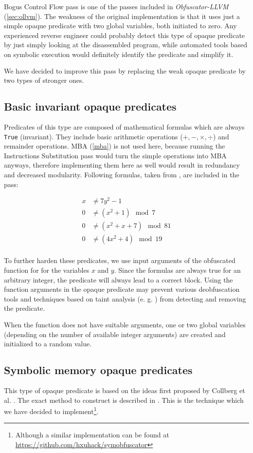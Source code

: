 \documentclass[
  digital, %
  table,   %
  twoside, %
  nolof,     %
  nolot,     %
]{fithesis3}
\theoremstyle{definition}
\begin{document}
Bogus Control Flow pass is one of the passes included in \textit{Obfuscator-LLVM} (\ref{sec:ollvm}). The weakness of the original implementation is that it uses just a simple opaque predicate with two global variables, both initiated to zero. Any experienced reverse engineer could probably detect this type of opaque predicate by just simply looking at the disassembled program, while automated tools based on symbolic execution would definitely identify the predicate and simplify it. 

We have decided to improve this pass by replacing the weak opaque predicate by two types of stronger ones.

\subsection{Basic invariant opaque predicates}
Predicates of this type are composed of mathematical formulas which are always \texttt{True} (invariant). They include basic arithmetic operations ($+, -, \times, \div$) and remainder operations. MBA (\ref{mba}) is not used here, because running the Instructions Substitution pass would turn the simple operations into MBA anyways, therefore implementing them here as well would result in redundancy and decreased modularity. Following formulas, taken from \cite{loop}, are included in the pass:

$$
\begin{aligned}
x &\neq 7y^2 - 1  \\
0 &\neq (x^2 + 1) \mod7 \\
0 &\neq (x^2 + x + 7) \mod 81  \\
0 &\neq (4x^2 + 4) \mod 19 \\
\end{aligned}
$$

To further harden these predicates, we use input arguments of the obfuscated function for for the variables $x$ and $y$. Since the formulas are always true for an arbitrary integer, the predicate will always lead to a correct block. Using the function arguments in the opaque predicate may prevent various deobfuscation tools and techniques based on taint analysis (e. g. \cite{generic_deobfuscation}) from detecting and removing the predicate. 

When the function does not have suitable arguments, one or two global variables (depending on the number of available integer arguments) are created and initialized to a random value. 

\subsection{Symbolic memory opaque predicates}
This type of opaque predicate is based on the ideas first proposed by Collberg et al. \cite{manufacturing_opaque}. The exact method to construct is described in \cite{bi_opaque}. This is the technique which we have decided to implement\footnote{Although a similar implementation can be found at \url{https://github.com/hxuhack/symobfuscator}}. 
\end{document}
